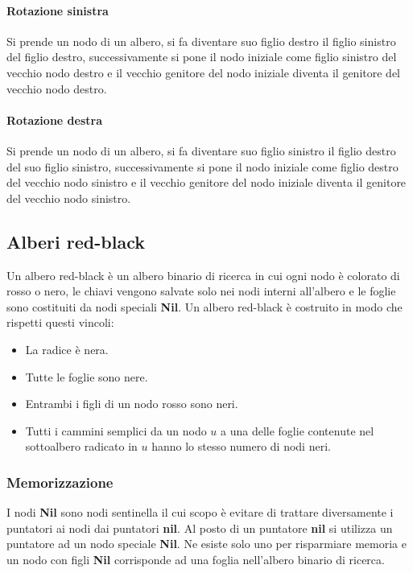 \paragraph{Rotazione sinistra}
Si prende un nodo di un albero, si fa diventare suo figlio destro il figlio sinistro del figlio destro, successivamente si pone il nodo iniziale come figlio
sinistro del vecchio nodo destro e il vecchio genitore del nodo iniziale diventa il genitore del vecchio nodo destro.
\paragraph{Rotazione destra}
Si prende un nodo di un albero, si fa diventare suo figlio sinistro il figlio destro del suo figlio sinistro, successivamente si pone il nodo iniziale come
figlio destro del vecchio nodo sinistro e il vecchio genitore del nodo iniziale diventa il genitore del vecchio nodo sinistro.
\begin{multicols}{2}
    
    \columnbreak
    
\end{multicols}

\subsection{Alberi red-black}
Un albero red-black \`e un albero binario di ricerca in cui ogni nodo \`e colorato di rosso o nero, le chiavi vengono salvate solo nei nodi interni
all'albero e le foglie sono costituiti da nodi speciali \textbf{Nil}. Un albero red-black \`e costruito in modo che rispetti questi vincoli:
\begin{itemize}
    \item La radice \`e nera.
    \item Tutte le foglie sono nere.
    \item Entrambi i figli di un nodo rosso sono neri.
    \item Tutti i cammini semplici da un nodo $u$ a una delle foglie contenute nel sottoalbero radicato in $u$ hanno lo stesso numero di nodi neri.
\end{itemize}
\subsubsection{Memorizzazione}
\begin{multicols}{2}
    
    \columnbreak
    I nodi \textbf{Nil} sono nodi sentinella il cui scopo \`e evitare di trattare diversamente i puntatori ai nodi dai puntatori \textbf{nil}. Al posto di un
    puntatore \textbf{nil} si utilizza un puntatore ad un nodo speciale \textbf{Nil}. Ne esiste solo uno per risparmiare memoria e un nodo con figli
    \textbf{Nil} corrisponde ad una foglia nell'albero binario di ricerca.
\end{multicols}
